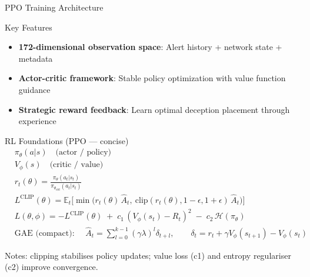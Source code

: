 \documentclass[aspectratio=169,xcolor=dvipsnames]{beamer}
\begin{document}
\begin{frame}{PPO Training Architecture}
\begin{center}
{
}
\end{center}

\begin{block}{Key Features}
\begin{itemize}
\item \textbf{172-dimensional observation space}: Alert history + network state + metadata  
\item \textbf{Actor-critic framework}: Stable policy optimization with value function guidance
\item \textbf{Strategic reward feedback}: Learn optimal deception placement through experience
\end{itemize}
\end{block}
\end{frame}

\begin{frame}{RL Foundations (PPO — concise)}
\scriptsize
\begin{align*}
  &\pi_\theta(a|s)\quad\text{(actor / policy)}\\
  &V_\phi(s)\quad\text{(critic / value)}\\[4pt]
  &r_t(\theta)=\frac{\pi_\theta(a_t|s_t)}{\pi_{\theta_{\text{old}}}(a_t|s_t)}\\[2pt]
  &L^{\mathrm{CLIP}}(\theta)=\mathbb{E}_t\Big[\min\big(r_t(\theta)\,\hat A_t,\ \mathrm{clip}(r_t(\theta),1-\epsilon,1+\epsilon)\,\hat A_t\big)\Big]\\[6pt]
  &L(\theta,\phi)= -L^{\mathrm{CLIP}}(\theta) \;+\; c_1\,(V_\phi(s_t)-R_t)^2 \;-\; c_2\,\mathcal H(\pi_\theta)\\[6pt]
  &\text{GAE (compact): }\quad \hat A_t=\sum_{l=0}^{k-1}(\gamma\lambda)^l\delta_{t+l},\qquad 
  \delta_t=r_t+\gamma V_\phi(s_{t+1})-V_\phi(s_t)
\end{align*}

\vspace{4pt}
\small Notes: clipping stabilises policy updates; value loss (c1) and entropy regulariser (c2) improve convergence.
\end{frame}
\end{document}
